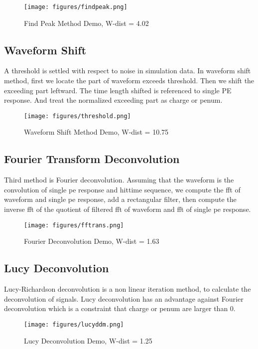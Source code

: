 \begin{figure}[H]
    \centering
    \caption{Find Peak Method Demo, W-dist = 4.02}
    \texttt{[image: figures/findpeak.png]}
\end{figure}

\subsection{Waveform Shift}
A threshold is settled with respect to noise in simulation data. In waveform shift method, first we locate the part of waveform exceeds threshold. Then we shift the exceeding part leftward. The time length shifted is referenced to single PE response. And treat the normalized exceeding part as charge or penum. 

\begin{figure}[H]
    \centering
    \caption{Waveform Shift Method Demo, W-dist = 10.75}
    \texttt{[image: figures/threshold.png]}
\end{figure}

\subsection{Fourier Transform Deconvolution}
Third method is Fourier deconvolution. Assuming that the waveform is the convolution of single pe response and hittime sequence, we compute the fft of waveform and single pe response, add a rectangular filter, then compute the inverse fft of the quotient of filtered fft of waveform and fft of single pe response. 

\begin{figure}[H]
    \centering
    \caption{Fourier Deconvolution Demo, W-dist = 1.63}
    \texttt{[image: figures/fftrans.png]}
\end{figure}

\subsection{Lucy Deconvolution}
Lucy-Richardson deconvolution is a non linear iteration method, to calculate the deconvolution of signals. Lucy deconvolution has an advantage against Fourier deconvolution which is a constraint that charge or penum are larger than 0. 

\begin{figure}[H]
    \centering
    \caption{Lucy Deconvolution Demo, W-dist = 1.25}
    \texttt{[image: figures/lucyddm.png]}
\end{figure}

